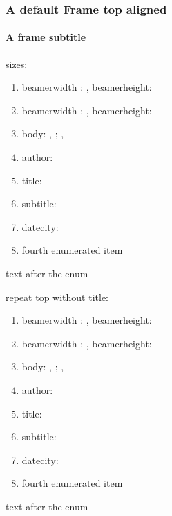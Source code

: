 \documentclass[german,aspectratio=169,notoc,titlestyle=tud,draft]{tudbeamer}%
\begin{document}
\begin{frame}[t]
	\frametitle{A default Frame top aligned}
	\framesubtitle{A frame subtitle}
	sizes:
	\begin{enumerate}
		\item beamerwidth : \the\paperwidth, beamerheight: \the\paperheight
		\item beamerwidth : \number\paperwidth, beamerheight:\number\paperheight
		\item body: \the\bodyx, \the\bodyy; \the\bodywidth, \the\bodywidth
		\item author: \insertauthor
		\item title: \inserttitle
		\item subtitle: \insertsubtitle
		\item datecity: \insertdatecity
		\item fourth enumerated item
	\end{enumerate}
	text after the enum
\end{frame}
\begin{frame}[t]
	repeat top without title:
	\begin{enumerate}
		\item beamerwidth : \the\paperwidth, beamerheight: \the\paperheight
		\item beamerwidth : \number\paperwidth, beamerheight:\number\paperheight
		\item body: \the\bodyx, \the\bodyy; \the\bodywidth, \the\bodywidth
		\item author: \insertauthor
		\item title: \inserttitle
		\item subtitle: \insertsubtitle
		\item datecity: \insertdatecity
		\item fourth enumerated item
	\end{enumerate}
	text after the enum
\end{frame}
\end{document}
